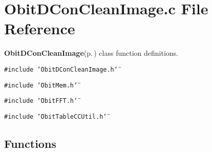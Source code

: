 \section{Obit\-DCon\-Clean\-Image.c File Reference}
\label{ObitDConCleanImage_8c}
{\bf Obit\-DCon\-Clean\-Image}{\rm (p.\,\pageref{structObitDConCleanImage})} class function definitions. 

{\tt \#include \char`\"{}Obit\-DCon\-Clean\-Image.h\char`\"{}}\par
{\tt \#include \char`\"{}Obit\-Mem.h\char`\"{}}\par
{\tt \#include \char`\"{}Obit\-FFT.h\char`\"{}}\par
{\tt \#include \char`\"{}Obit\-Table\-CCUtil.h\char`\"{}}\par
\subsection*{Functions}
